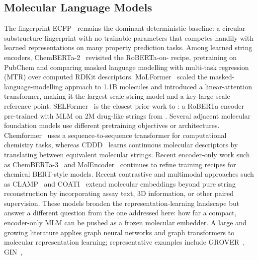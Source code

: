 \documentclass[11pt,a4paper]{article}
\begin{document}
\subsection{Molecular Language Models}
\label{sec:rel-lms}

The fingerprint ECFP~\citep{rogersExtendedConnectivityFingerprints2010} remains the
dominant deterministic baseline: a circular-substructure fingerprint
with no trainable parameters that competes handily with learned
representations on many property prediction tasks.
Among learned string encoders, ChemBERTa-2~\citep{ahmadChemBERTa2TowardsChemical2022}
revisited the RoBERTa-on-\smiles{} recipe, pretraining on PubChem
\smiles{} and comparing masked language modelling with multi-task
regression (MTR) over computed RDKit descriptors.
MoLFormer~\citep{rossLargescaleChemicalLanguage2022} scaled the
masked-language-modelling approach to 1.1B molecules and introduced a
linear-attention
transformer, making it the largest-scale \smiles{} string model and
a key large-scale reference point.
SELFormer~\citep{yukselSELFormerMolecularRepresentation2023} is the
closest prior work to \model{}: a RoBERTa encoder pre-trained with MLM
on 2M drug-like \selfies{} strings from \chembl{}.
Several adjacent molecular foundation models use different pretraining
objectives or architectures. Chemformer~\citep{irwinChemformerPretrainedTransformer2022}
uses a sequence-to-sequence transformer for computational chemistry tasks,
whereas CDDD~\citep{winterLearningContinuousDataDriven2019} learns continuous
molecular descriptors by translating between equivalent molecular strings.
Recent encoder-only work such as ChemBERTa-3~\citep{singhChemBERTa3OpenSource2025}
and MolEncoder~\citep{krugerMolEncoderOptimalMasked2025} continues to refine
training recipes for chemical BERT-style models. Recent contrastive and
multimodal approaches such as CLAMP~\citep{seidlEnhancingActivityPrediction2023}
and COATI~\citep{axelrodCOATIMultimodalContrastive2024} extend molecular
embeddings beyond pure string reconstruction by incorporating assay text,
3D information, or other paired supervision. These models broaden the
representation-learning landscape but answer a different question from the
one addressed here: how far a compact, encoder-only \selfies{} MLM can be
pushed as a frozen molecular embedder.
A large and growing literature applies graph neural networks and
graph transformers to molecular representation learning; representative
examples include GROVER~\citep{rongGroverTransformerSelfsupervised2020},
GIN~\citep{huStrategiesPretrainingGraph2020},
\end{document}
